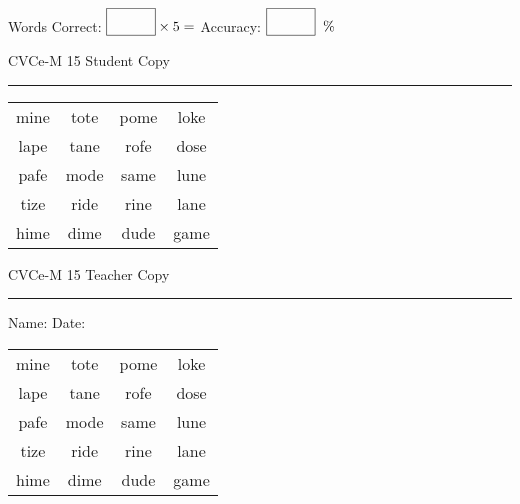 \documentclass{memoir}
\begin{document}
\small

Words Correct: $\fbox{\phantom{\huge 100}} \times 5 = $ Accuracy: $\fbox{\phantom{\huge 100}}\;\; \%$ 

\vfill

\newpage


\footnotesize \noindent
CVCe-M 15 \hfill Student Copy
\smallskip
\hrule

\Large

\setlength{\tabcolsep}{14pt}
\def\arraystretch{2}

{\selectfont


\begin{vplace}[0.5]
\begin{center}
\begin{tabular}{cccc}
mine & tote & pome & loke \\
lape & tane & rofe & dose \\
pafe & mode & same & lune \\
tize & ride & rine & lane \\
hime & dime & dude & game \\
\end{tabular}
\end{center}
\end{vplace}

}

\newpage

\footnotesize \noindent
CVCe-M 15 \hfill Teacher Copy
\smallskip
\hrule

\small

\vfill

\noindent
Name: \underline{\hspace{1.75in}} \hfill Date: \underline{\hspace{1in}}

\Large

{\selectfont


\begin{vplace}[0.5]
\begin{center}
\begin{tabular}{cccc}
mine & tote & pome & loke \\
lape & tane & rofe & dose \\
pafe & mode & same & lune \\
tize & ride & rine & lane \\
hime & dime & dude & game \\
\end{tabular}
\end{center}
\end{vplace}



}
\end{document}
